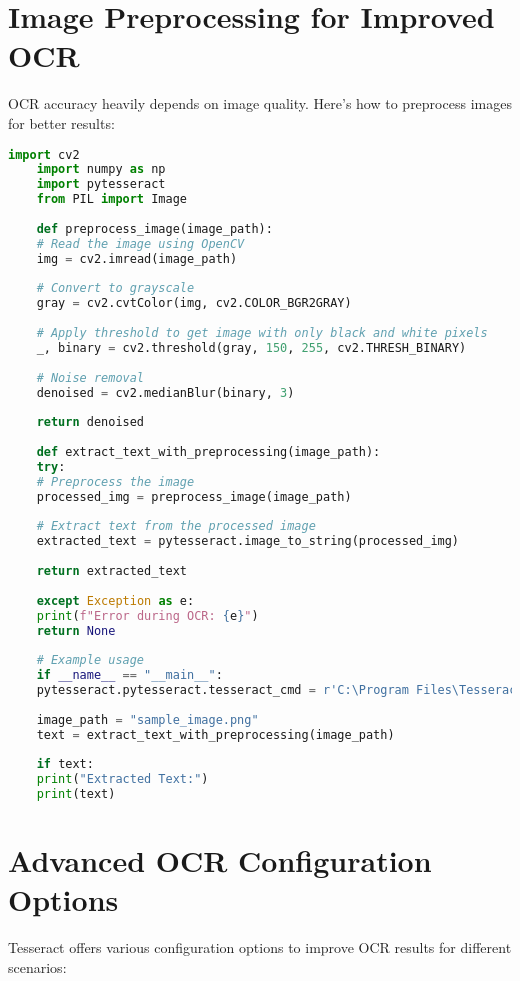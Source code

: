 \section{Image Preprocessing for Improved OCR}
OCR accuracy heavily depends on image quality. Here's how to preprocess images for better results:

\begin{lstlisting}[language=Python]
	import cv2
	import numpy as np
	import pytesseract
	from PIL import Image
	
	def preprocess_image(image_path):
	# Read the image using OpenCV
	img = cv2.imread(image_path)
	
	# Convert to grayscale
	gray = cv2.cvtColor(img, cv2.COLOR_BGR2GRAY)
	
	# Apply threshold to get image with only black and white pixels
	_, binary = cv2.threshold(gray, 150, 255, cv2.THRESH_BINARY)
	
	# Noise removal
	denoised = cv2.medianBlur(binary, 3)
	
	return denoised
	
	def extract_text_with_preprocessing(image_path):
	try:
	# Preprocess the image
	processed_img = preprocess_image(image_path)
	
	# Extract text from the processed image
	extracted_text = pytesseract.image_to_string(processed_img)
	
	return extracted_text
	
	except Exception as e:
	print(f"Error during OCR: {e}")
	return None
	
	# Example usage
	if __name__ == "__main__":
	pytesseract.pytesseract.tesseract_cmd = r'C:\Program Files\Tesseract-OCR\tesseract.exe'
	
	image_path = "sample_image.png"
	text = extract_text_with_preprocessing(image_path)
	
	if text:
	print("Extracted Text:")
	print(text)
\end{lstlisting}

\section{Advanced OCR Configuration Options}
Tesseract offers various configuration options to improve OCR results for different scenarios:

